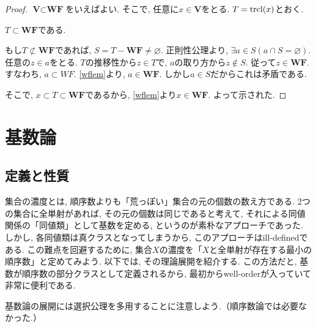 \documentclass[a4paper, twoside]{bxjsarticle}
\theoremstyle{definition}
\begin{document}
         \begin{proof}
            $\textbf{V}\subset \textbf{WF}$をいえばよい. そこで, 任意に$x\in \textbf{V}$をとる. $T={\rm trcl}(x)$とおく.
            
            $T\subset \textbf{WF}$である.
            \begin{framed}
                もし$T\not\subset \textbf{WF}$であれば, $S=T-\textbf{WF}\neq\varnothing$. 正則性公理より, $\exists a\in S(a\cap S=\varnothing)$. 任意の$z\in a$をとる. $T$の推移性から$z\in T$で, $a$の取り方から$z \not\in S$. 従って$z\in \textbf{WF}$. すなわち, $a\subset WF$. \ref{wflem}より, $a\in \textbf{WF}$. しかし$a\in S$だからこれは矛盾である.
            \end{framed}
            そこで, $x\subset T\subset \textbf{WF}$であるから, \ref{wflem}より$x\in \textbf{WF}$. よって示された.
         \end{proof}
         
    \cleardoublepage
    
    \section{基数論}
    \subsection{定義と性質}
        集合の濃度とは, 順序数よりも「荒っぽい」集合の元の個数の数え方である. 2つの集合に全単射があれば, その元の個数は同じであると考えて, それによる同値関係の「同値類」として基数を定める, というのが素朴なアプローチであった. しかし, 各同値類は真クラスとなってしまうから, このアプローチはill-definedである. この難点を回避するために, 集合$X$の濃度を「$X$と全単射が存在する最小の順序数」と定めてみよう. 以下では, その理論展開を紹介する. この方法だと, 基数が順序数の部分クラスとして定義されるから, 最初からwell-orderが入っていて非常に便利である.
        
         基数論の展開には選択公理を多用することに注意しよう.（順序数論では必要なかった.）
        
\end{document}
